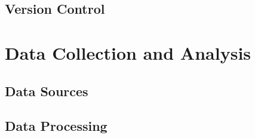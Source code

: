     \subsection{Version Control}
    

\section{Data Collection and Analysis}
    \subsection{Data Sources}
    \subsection{Data Processing}
    
